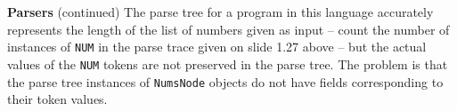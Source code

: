 \begin{minipage}[t]{\sw}
\slidenumber
\LARGE
{\bf Parsers} (continued)\exx
\emm\LightBox{\MYlonGrammarOnly}\exx
The parse tree for a program in this language
accurately represents the length
of the list of numbers given as input -- 
count the number of instances of \verb'NUM'
in the parse trace given on slide 1.27 above --
but the actual values of the \verb'NUM' tokens
are not preserved in the parse tree.
The problem is that the parse tree instances of \verb'NumsNode' objects
do not have fields corresponding to their token values.\exx
\end{minipage}
\clearpage
